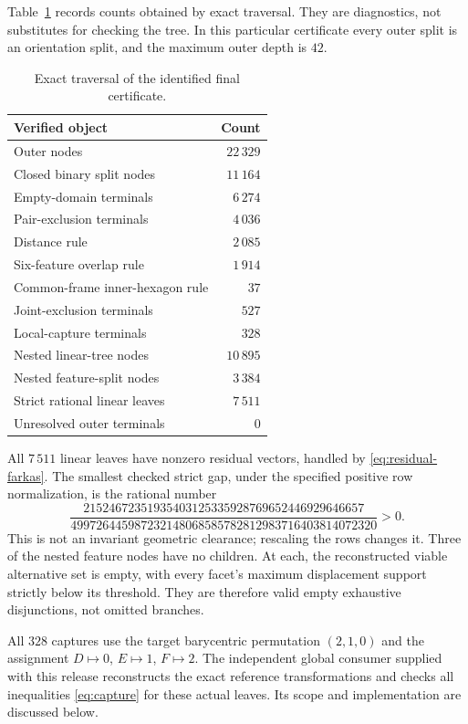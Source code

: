 \documentclass[11pt]{article}
\begin{document}
Table~\ref{tab:counts} records counts obtained by exact traversal. They are diagnostics, not substitutes for checking the tree. In this particular certificate every outer split is an orientation split, and the maximum outer depth is $42$.

\begin{table}[htbp]
\centering
\begin{tabular}{l r}
\hline
Verified object & Count\\\hline
Outer nodes & $22\,329$\\
Closed binary split nodes & $11\,164$\\
Empty-domain terminals & $6\,274$\\
Pair-exclusion terminals & $4\,036$\\
\quad Distance rule & $2\,085$\\
\quad Six-feature overlap rule & $1\,914$\\
\quad Common-frame inner-hexagon rule & $37$\\
Joint-exclusion terminals & $527$\\
Local-capture terminals & $328$\\
Nested linear-tree nodes & $10\,895$\\
Nested feature-split nodes & $3\,384$\\
Strict rational linear leaves & $7\,511$\\
Unresolved outer terminals & $0$\\\hline
\end{tabular}
\caption{Exact traversal of the identified final certificate.}\label{tab:counts}
\end{table}

All $7\,511$ linear leaves have nonzero residual vectors, handled by \eqref{eq:residual-farkas}. The smallest checked strict gap, under the specified positive row normalization, is the rational number
\[
 \frac{21524672351935403125335928769652446929646657}
 {499726445987232148068585782812983716403814072320}>0.
\]
This is not an invariant geometric clearance; rescaling the rows changes it. Three of the nested feature nodes have no children. At each, the reconstructed viable alternative set is empty, with every facet's maximum displacement support strictly below its threshold. They are therefore valid empty exhaustive disjunctions, not omitted branches.

All $328$ captures use the target barycentric permutation $(2,1,0)$ and the assignment $D\mapsto0$, $E\mapsto1$, $F\mapsto2$. The independent global consumer supplied with this release reconstructs the exact reference transformations and checks all inequalities \eqref{eq:capture} for these actual leaves. Its scope and implementation are discussed below.
\end{document}
